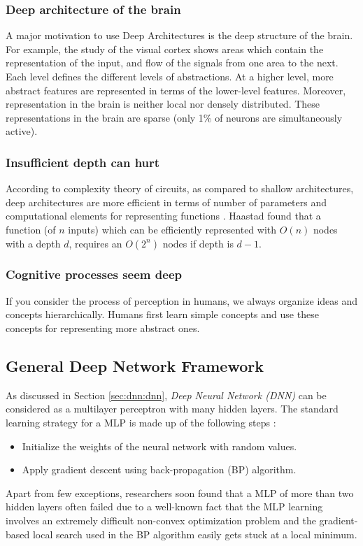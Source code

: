 \subsubsection{Deep architecture of the brain}
A major motivation to use Deep Architectures is the deep structure of the brain.  For example, the study of the visual cortex shows areas which contain the representation of the input, and flow of the signals from one area to the next.  Each level defines the different levels of abstractions.  At a higher level, more abstract features are represented in terms of the lower-level features.  Moreover, representation in the brain is neither local nor densely distributed.  These representations in the brain are sparse (only 1\% of neurons are simultaneously active).

\subsubsection{Insufficient depth can hurt}
According to complexity theory of  circuits, as compared to shallow architectures, deep architectures are more efficient in terms of number of parameters and computational elements for representing functions \citep{bengio2007scaling}.  Haastad\citep{bengio2007greedy} found that a function (of $n$ inputs) which can be efficiently represented with $O(n)$ nodes with a depth $d$, requires an $O(2^n)$ nodes if depth is $d-1$.

\subsubsection{Cognitive processes seem deep}
If you consider the process of perception in humans, we always organize ideas and concepts hierarchically.  Humans first learn simple concepts and use these concepts for representing more abstract ones. 

\subsection{General Deep Network Framework}
As discussed in Section \ref{sec:dnn:dnn}, \textit{Deep Neural Network (DNN)} can be considered as a multilayer perceptron with many hidden layers.  The standard learning strategy for a MLP is made up of the following steps :
\begin{itemize}
\item Initialize the weights of the neural network with random values.
\item Apply gradient descent using back-propagation (BP) algorithm.
\end{itemize}
Apart from few exceptions, researchers soon found that a MLP of more than two hidden layers often failed \cite{bengio2007greedy} due to a well-known fact that the MLP learning involves an extremely difficult non-convex optimization problem and the gradient-based local search used in
the BP algorithm easily gets stuck at a local minimum. 

